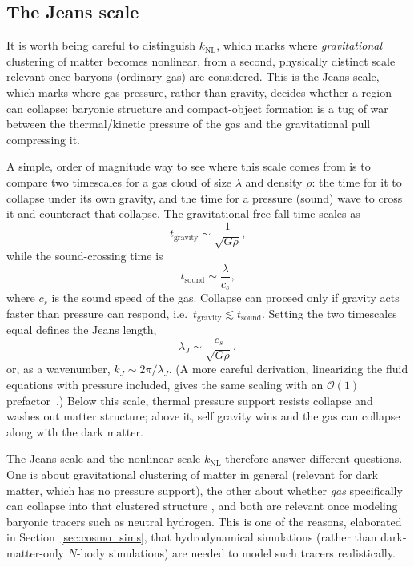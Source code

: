 \subsection{The Jeans scale}

It is worth being careful to distinguish $k_\text{NL}$, which marks where \emph{gravitational} clustering of matter becomes nonlinear, from a second, physically distinct scale relevant once baryons (ordinary gas) are considered. This is the Jeans scale, which marks where gas pressure, rather than gravity, decides whether a region can collapse: baryonic structure and compact-object formation is a tug of war between the thermal/kinetic pressure of the gas and the gravitational pull compressing it.

A simple, order of magnitude way to see where this scale comes from is to compare two timescales for a gas cloud of size $\lambda$ and density $\rho$: the time for it to collapse under its own gravity, and the time for a pressure (sound) wave to cross it and counteract that collapse. The gravitational free fall time scales as
\begin{equation}
    t_\text{gravity} \sim \frac{1}{\sqrt{G\rho}},
\end{equation}
while the sound-crossing time is
\begin{equation}
    t_\text{sound} \sim \frac{\lambda}{c_s},
\end{equation}
where $c_s$ is the sound speed of the gas. Collapse can proceed only if gravity acts faster than pressure can respond, i.e.\ $t_\text{gravity} \lesssim t_\text{sound}$. Setting the two timescales equal defines the Jeans length,
\begin{equation}
    \lambda_J \sim \frac{c_s}{\sqrt{G\rho}},
\end{equation}
or, as a wavenumber, $k_J\sim 2\pi/\lambda_J$. (A more careful derivation, linearizing the fluid equations with pressure included, gives the same scaling with an $\mathcal{O}(1)$ prefactor~\citep{peacock_cosmological_1998}.) Below this scale, thermal pressure support resists collapse and washes out matter structure; above it, self gravity wins and the gas can collapse along with the dark matter.

The Jeans scale and the nonlinear scale $k_\text{NL}$ therefore answer different questions. One is about gravitational clustering of matter in general (relevant for dark matter, which has no pressure support), the other about whether \emph{gas} specifically can collapse into that clustered structure , and both are relevant once modeling baryonic tracers such as neutral hydrogen. This is one of the reasons, elaborated in Section~\ref{sec:cosmo_sims}, that hydrodynamical simulations (rather than dark-matter-only $N$-body simulations) are needed to model such tracers realistically.

